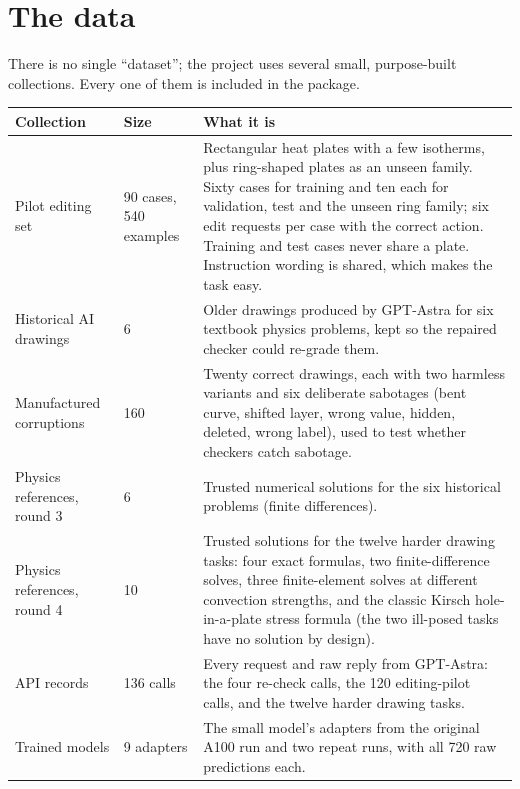\documentclass[11pt,a4paper]{article}
\begin{document}
\section{The data}

There is no single ``dataset''; the project uses several small, purpose-built collections. Every one of them is included in the package.

\begin{longtable}{L{4.0cm} L{2.6cm} L{8.4cm}}
\toprule
Collection & Size & What it is \\
\midrule
Pilot editing set & 90 cases, 540 examples & Rectangular heat plates with a few isotherms, plus ring-shaped plates as an unseen family. Sixty cases for training and ten each for validation, test and the unseen ring family; six edit requests per case with the correct action. Training and test cases never share a plate. Instruction wording is shared, which makes the task easy. \\
Historical AI drawings & 6 & Older drawings produced by GPT-Astra for six textbook physics problems, kept so the repaired checker could re-grade them. \\
Manufactured corruptions & 160 & Twenty correct drawings, each with two harmless variants and six deliberate sabotages (bent curve, shifted layer, wrong value, hidden, deleted, wrong label), used to test whether checkers catch sabotage. \\
Physics references, round 3 & 6 & Trusted numerical solutions for the six historical problems (finite differences). \\
Physics references, round 4 & 10 & Trusted solutions for the twelve harder drawing tasks: four exact formulas, two finite-difference solves, three finite-element solves at different convection strengths, and the classic Kirsch hole-in-a-plate stress formula (the two ill-posed tasks have no solution by design). \\
API records & 136 calls & Every request and raw reply from GPT-Astra: the four re-check calls, the 120 editing-pilot calls, and the twelve harder drawing tasks. \\
Trained models & 9 adapters & The small model's adapters from the original A100 run and two repeat runs, with all 720 raw predictions each. \\
\bottomrule
\end{longtable}

\end{document}
